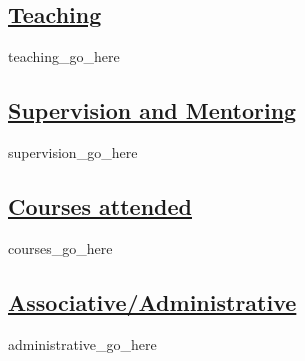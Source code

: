 \documentclass[11pt,a4paper,roman]{moderncv} %
\begin{document}
    \subsection{\underline{Teaching}}
{{teaching_go_here}}

    \subsection{\underline{Supervision and Mentoring}}
{{supervision_go_here}}

    \subsection{\underline{Courses attended}}
{{courses_go_here}}

    \subsection{\underline{Associative/Administrative}}
{{administrative_go_here}}


\end{document}
